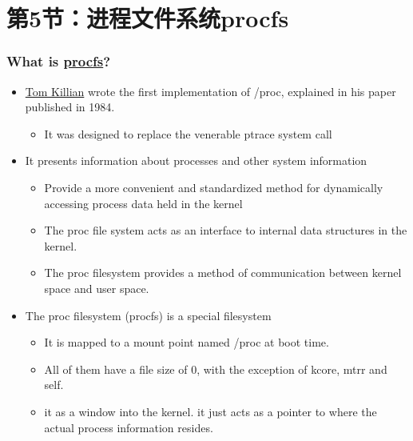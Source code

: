 \section{第5节：进程文件系统procfs}
% 
\begin{frame}[fragile]
    \frametitle{What is \href{https://en.wikipedia.org/wiki/Procfs}{procfs}?}


    \begin{itemize}
        \item \href{http://dtrace.org/blogs/eschrock/2004/06/25/a-brief-history-of-proc/}{Tom Killian} wrote the first implementation of /proc, explained in his paper published in 1984.
	    \begin{itemize}
	        \item It was designed to replace the venerable ptrace system call
      \end{itemize} \pause
        \item It presents information about processes and other system information
	    \begin{itemize}
	        \item Provide a more convenient and standardized method for dynamically accessing process data held in the kernel
          \item The proc file system acts as an interface to internal data structures in the kernel.
          \item The proc filesystem provides a method of communication between kernel space and user space.
      \end{itemize} \pause
        \item The proc filesystem (procfs) is a special filesystem
	    \begin{itemize}
	        \item It is mapped to a mount point named /proc at boot time.
          \item All of them have a file size of 0, with the exception of kcore, mtrr  and self.
          \item it as a window into the kernel. it just acts as a pointer to where the actual  process information resides.
      \end{itemize}
    \end{itemize}
% 
\end{frame}
